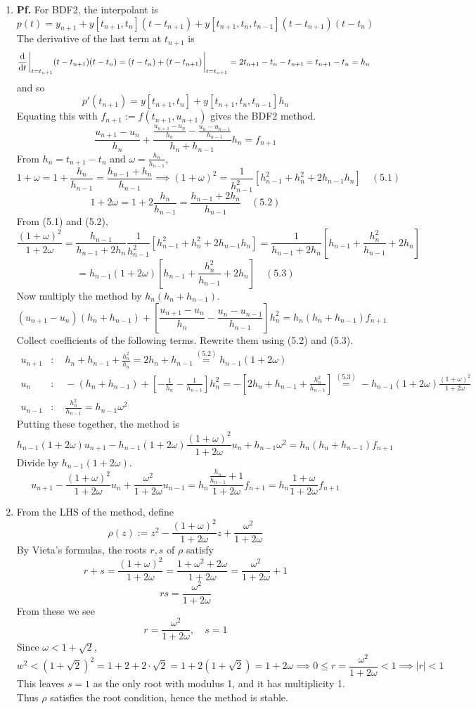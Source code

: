 \documentclass{article}
\def\tbf#1{\textbf{#1}}
\newcommand{\sbr}[1]{\left[#1\right]}
\newcommand{\pf}{\tbf{Pf. }}
\newcommand{\imp}{\implies}
\newcommand{\sep}[1][.5cm]{\vspace{#1}}
\newcommand{\om}{\omega}
\begin{document}
\begin{enumerate}[label=(\alph*)]
	
\item \pf For BDF2, the interpolant is
$$p(t) = y_{n+1} + y[t_{n+1},t_n](t-t_{n+1}) + y[t_{n+1},t_n,t_{n-1}](t-t_{n+1})(t-t_n)$$
The derivative of the last term at $t_{n+1}$ is
$$\dv{t}\eval_{t=t_{n+1}} (t-t_{n+1})(t-t_n)
= (t-t_{n})+(t-t_{n+1})\eval_{t=t_{n+1}}
= 2t_{n+1}-t_{n}-t_{n+1}
= t_{n+1}-t_n
= h_n$$
and so
$$p'(t_{n+1}) = y[t_{n+1},t_n] + y[t_{n+1},t_n,t_{n-1}]h_n$$
Equating this with $f_{n+1}:=f(t_{n+1},u_{n+1})$ gives the BDF2 method.
$$\frac{u_{n+1}-u_n}{h_n} + \frac{\frac{u_{n+1}-u_n}{h_n} - \frac{u_n-u_{n-1}}{h_{n-1}}}{h_n+h_{n-1}}h_n = f_{n+1}$$
From $h_n=t_{n+1}-t_n$ and $\om=\frac{h_n}{h_{n-1}}$,
$$1 + \om = 1 + \frac{h_n}{h_{n-1}} = \frac{h_{n-1}+h_n}{h_{n-1}}
\imp (1+\om)^2 = \frac{1}{h_{n-1}^2}\sbr{h_{n-1}^2+h_n^2+2h_{n-1}h_n} \quad (5.1)$$
$$1 + 2\om = 1 + 2\frac{h_n}{h_{n-1}} = \frac{h_{n-1}+2h_n}{h_{n-1}} \quad (5.2)$$
From (5.1) and (5.2),
$$\frac{(1+\om)^2}{1+2\om} = \frac{h_{n-1}}{h_{n-1}+2h_n}\frac{1}{h_{n-1}^2}\sbr{h_{n-1}^2+h_n^2+2h_{n-1}h_n}
= \frac{1}{h_{n-1}+2h_n}\sbr{h_{n-1}+\frac{h_n^2}{h_{n-1}}+2h_n}$$
$$= h_{n-1}(1+2\om)\sbr{h_{n-1}+\frac{h_n^2}{h_{n-1}}+2h_n} \quad (5.3)$$
Now multiply the method by $h_n(h_n+h_{n-1})$.
$$(u_{n+1}-u_n)(h_n+h_{n-1}) + \sbr{\frac{u_{n+1}-u_n}{h_n} - \frac{u_n-u_{n-1}}{h_{n-1}}}h_n^2 = h_n(h_n+h_{n-1})f_{n+1}$$
Collect coefficients of the following terms. Rewrite them using (5.2) and (5.3).
\begin{align*}
	u_{n+1} &: \quad h_n + h_{n-1} + \frac{h_n^2}{h_n} = 2h_n + h_{n-1} \overset{(5.2)}{=} h_{n-1}(1+2\om) \\
	u_n &: \quad -(h_n + h_{n-1}) + \sbr{-\frac{1}{h_n} - \frac{1}{h_{n-1}}}h_n^2 = -\sbr{2h_n + h_{n-1} + \frac{h_n^2}{h_{n-1}}} \overset{(5.3)}{=} -h_{n-1}(1+2\om)\frac{(1+\om)^2}{1+2\om} \\
	u_{n-1} &: \quad \frac{h_n^2}{h_{n-1}} = h_{n-1}\om^2
\end{align*}
Putting these together, the method is
$$h_{n-1}(1+2\om)u_{n+1} - h_{n-1}(1+2\om)\frac{(1+\om)^2}{1+2\om}u_n + h_{n-1}\om^2 = h_n(h_n+h_{n-1})f_{n+1}$$
Divide by $h_{n-1}(1+2\om)$.
$$u_{n+1} - \frac{(1+\om)^2}{1+2\om}u_n + \frac{\om^2}{1+2\om}u_{n-1} = h_n\frac{\frac{h_n}{h_{n-1}}+1}{1+2\om}f_{n+1}
= h_n\frac{1+\om}{1+2\om}f_{n+1}$$


\item From the LHS of the method, define
$$\rho(z) := z^2 - \frac{(1+\om)^2}{1+2\om}z + \frac{\om^2}{1+2\om}$$
By Vieta's formulas, the roots $r,s$ of $\rho$ satisfy
$$r + s = \frac{(1+\om)^2}{1+2\om} = \frac{1+\om^2+2\om}{1+2\om} = \frac{\om^2}{1+2\om} + 1$$
$$rs = \frac{\om^2}{1+2\om}$$
From these we see
$$r = \frac{\om^2}{1+2\om},
\quad s = 1$$
Since $\om<1+\sqrt2$,
$$w^2 < (1+\sqrt2)^2 = 1 + 2 + 2\cdot\sqrt2 = 1 + 2(1+\sqrt2) = 1 + 2\om
\imp 0 \le r = \frac{\om^2}{1+2\om} < 1
\imp |r|<1$$
This leaves $s=1$ as the only root with modulus 1, and it has multiplicity 1. Thus $\rho$ satisfies the root condition, hence the method is stable.

\end{enumerate}
\sep
\end{document}

